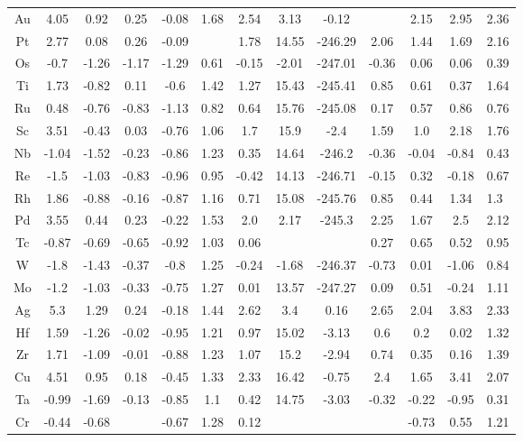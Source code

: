 \begin{center}
\begin{tabular}{| c | c | c | c | c | c | c | c | c | c | c | c |}
Au & 4.05 & 0.92 & 0.25 & -0.08 & 1.68 & 2.54 & 3.13 & -0.12 &  & 2.15 & 2.95 & 2.36 \\
Pt & 2.77 & 0.08 & 0.26 & -0.09 &  & 1.78 & 14.55 & -246.29 & 2.06 & 1.44 & 1.69 & 2.16 \\
Os & -0.7 & -1.26 & -1.17 & -1.29 & 0.61 & -0.15 & -2.01 & -247.01 & -0.36 & 0.06 & 0.06 & 0.39 \\
Ti & 1.73 & -0.82 & 0.11 & -0.6 & 1.42 & 1.27 & 15.43 & -245.41 & 0.85 & 0.61 & 0.37 & 1.64 \\
Ru & 0.48 & -0.76 & -0.83 & -1.13 & 0.82 & 0.64 & 15.76 & -245.08 & 0.17 & 0.57 & 0.86 & 0.76 \\
Sc & 3.51 & -0.43 & 0.03 & -0.76 & 1.06 & 1.7 & 15.9 & -2.4 & 1.59 & 1.0 & 2.18 & 1.76 \\
Nb & -1.04 & -1.52 & -0.23 & -0.86 & 1.23 & 0.35 & 14.64 & -246.2 & -0.36 & -0.04 & -0.84 & 0.43 \\
Re & -1.5 & -1.03 & -0.83 & -0.96 & 0.95 & -0.42 & 14.13 & -246.71 & -0.15 & 0.32 & -0.18 & 0.67 \\
Rh & 1.86 & -0.88 & -0.16 & -0.87 & 1.16 & 0.71 & 15.08 & -245.76 & 0.85 & 0.44 & 1.34 & 1.3 \\
Pd & 3.55 & 0.44 & 0.23 & -0.22 & 1.53 & 2.0 & 2.17 & -245.3 & 2.25 & 1.67 & 2.5 & 2.12 \\
Tc & -0.87 & -0.69 & -0.65 & -0.92 & 1.03 & 0.06 &  &  & 0.27 & 0.65 & 0.52 & 0.95 \\
W & -1.8 & -1.43 & -0.37 & -0.8 & 1.25 & -0.24 & -1.68 & -246.37 & -0.73 & 0.01 & -1.06 & 0.84 \\
Mo & -1.2 & -1.03 & -0.33 & -0.75 & 1.27 & 0.01 & 13.57 & -247.27 & 0.09 & 0.51 & -0.24 & 1.11 \\
Ag & 5.3 & 1.29 & 0.24 & -0.18 & 1.44 & 2.62 & 3.4 & 0.16 & 2.65 & 2.04 & 3.83 & 2.33 \\
Hf & 1.59 & -1.26 & -0.02 & -0.95 & 1.21 & 0.97 & 15.02 & -3.13 & 0.6 & 0.2 & 0.02 & 1.32 \\
Zr & 1.71 & -1.09 & -0.01 & -0.88 & 1.23 & 1.07 & 15.2 & -2.94 & 0.74 & 0.35 & 0.16 & 1.39 \\
Cu & 4.51 & 0.95 & 0.18 & -0.45 & 1.33 & 2.33 & 16.42 & -0.75 & 2.4 & 1.65 & 3.41 & 2.07 \\
Ta & -0.99 & -1.69 & -0.13 & -0.85 & 1.1 & 0.42 & 14.75 & -3.03 & -0.32 & -0.22 & -0.95 & 0.31 \\
Cr & -0.44 & -0.68 &  & -0.67 & 1.28 & 0.12 &  &  &  & -0.73 & 0.55 & 1.21 \\

\end{tabular}
\end{center}
